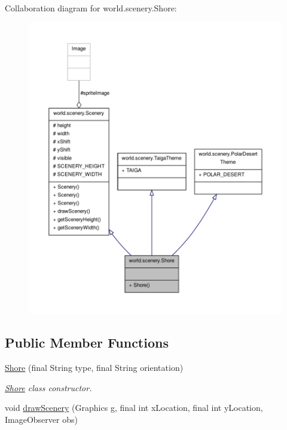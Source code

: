 Collaboration diagram for world.\-scenery.\-Shore\-:
\nopagebreak
\begin{figure}[H]
\begin{center}
\leavevmode
\includegraphics[width=350pt]{classworld_1_1scenery_1_1_shore__coll__graph}
\end{center}
\end{figure}
\subsection*{Public Member Functions}
\begin{DoxyCompactItemize}
\item 
\hyperlink{classworld_1_1scenery_1_1_shore_a91873a583f2f5801995937359f8174c2}{Shore} (final String type, final String orientation)
\begin{DoxyCompactList}\small\item\em \hyperlink{classworld_1_1scenery_1_1_shore}{Shore} class constructor. \end{DoxyCompactList}\item 
void \hyperlink{classworld_1_1scenery_1_1_scenery_a626c1ae7fa15d2f96d564c35368fdbc9}{draw\-Scenery} (Graphics g, final int x\-Location, final int y\-Location, Image\-Observer obs)
\end{DoxyCompactItemize}
